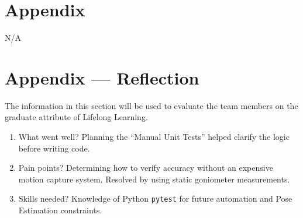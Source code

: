 \documentclass[12pt, titlepage]{article}
\begin{document}



\newpage

\section{Appendix}
N/A

\newpage{}
\section*{Appendix --- Reflection}

The information in this section will be used to evaluate the team members on the
graduate attribute of Lifelong Learning.



\begin{enumerate}
  \item What went well? Planning the ``Manual Unit Tests'' helped clarify the logic before writing code.
  \item Pain points? Determining how to verify accuracy without an expensive motion capture system. Resolved by using static goniometer measurements.
  \item Skills needed? Knowledge of Python \texttt{pytest} for future automation and Pose Estimation constraints.
\end{enumerate}
\end{document}
